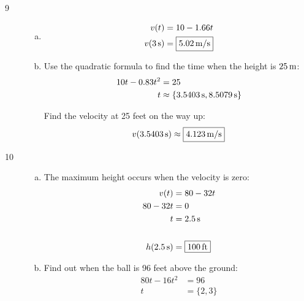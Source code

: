 \documentclass[letterpaper, landscape]{exam}
\begin{document}
\begin{description}
\begin{enumerate}[(a)]
      \end{enumerate}


    \item[9]
      \begin{enumerate}[(a)]
        \item 
          \begin{align*}
            v(t)           & = 10 - 1.66t \\
            v(\unit[3]{s}) & = \boxed{ \unit[5.02]{m/s} } \\
          \end{align*}

        \item
          Use the quadratic formula to find the time when the height is $\unit[25]{m}$:
          \begin{align*}
            10 t - 0.83 t^2 & = 25 \\
            t               & \approx \{ \unit[3.5403]{s}, \unit[8.5079]{s} \} \\
          \end{align*}

          Find the velocity at 25 feet on the way up:
          \[
            v(\unit[3.5403]{s}) \approx \boxed{ \unit[4.123]{m/s} }
          \]

      \end{enumerate}
      
    \newpage

    \item[10]
      \begin{enumerate}[(a)]
        \item 
          The maximum height occurs when the velocity is zero:
          \begin{align*}
            v(t)             & = 80 - 32t \\
            80 - 32t         & = 0 \\
            t                & = \unit[2.5]{s} \\
            \\
            h(\unit[2.5]{s}) & = \boxed{ \unit[100]{ft} } \\
          \end{align*}

        \item
          Find out when the ball is 96 feet above the ground:
          \begin{align*}
            80t - 16t^2 & = 96 \\
            t           & = \{ 2, 3 \} \\
          \end{align*}


\end{enumerate}
\end{description}
\end{document}
